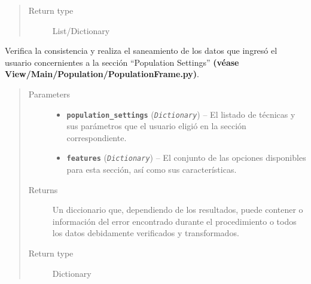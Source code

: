 \documentclass[letterpaper,10pt,english]{sphinxmanual}
\begin{document}
\begin{fulllineitems}
\begin{fulllineitems}
\begin{quote}
\begin{description}
\item[{Return type}] \leavevmode
List/Dictionary

\end{description}\end{quote}

\end{fulllineitems}


\begin{fulllineitems}
\label{Controller/Verifier:Controller.Verifier.Verifier.sanitize_population_settings}
Verifica la consistencia y realiza el saneamiento de los datos
que ingresó el usuario concernientes a la sección ``Population Settings''
\textbf{(véase View/Main/Population/PopulationFrame.py)}.
\begin{quote}\begin{description}
\item[{Parameters}] \leavevmode\begin{itemize}
\item {} 
\textbf{\texttt{population\_settings}} (\emph{\texttt{Dictionary}}) -- El listado de técnicas y sus parámetros que el usuario
eligió en la sección correspondiente.

\item {} 
\textbf{\texttt{features}} (\emph{\texttt{Dictionary}}) -- El conjunto de las opciones disponibles 
para esta sección, así como sus características.

\end{itemize}

\item[{Returns}] \leavevmode
Un diccionario que, dependiendo de los resultados, puede contener
o información del error encontrado durante el procedimiento o 
todos los datos debidamente verificados y transformados.

\item[{Return type}] \leavevmode
Dictionary

\end{description}\end{quote}

\end{fulllineitems}



\end{fulllineitems}
\end{document}

